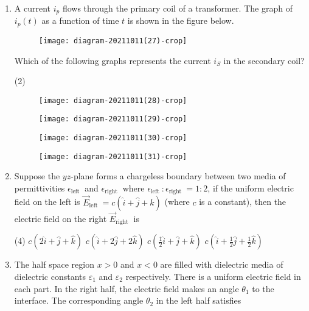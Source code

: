 \begin{enumerate}
	\item A current $i_{p}$ flows through the primary coil of a transformer. The graph of $i_{p}(t)$ as a function of time $t$ is shown in the figure below.\\
	\begin{figure}[H]
		\centering
		\texttt{[image: diagram-20211011(27)-crop]}
	\end{figure}
	Which of the following graphs represents the current $i_{S}$ in the secondary coil?
	{}
	\begin{tasks}(2)
		\task[\textbf{A.}] \begin{figure}[H]
			\centering
			\texttt{[image: diagram-20211011(28)-crop]}
		\end{figure}
		\task[\textbf{B.}] \begin{figure}[H]
			\centering
			\texttt{[image: diagram-20211011(29)-crop]}
		\end{figure}
		\task[\textbf{C.}] \begin{figure}[H]
			\centering
			\texttt{[image: diagram-20211011(30)-crop]}
		\end{figure}
		\task[\textbf{D.}] \begin{figure}[H]
			\centering
			\texttt{[image: diagram-20211011(31)-crop]}
		\end{figure}
	\end{tasks}
	\item Suppose the $y z$-plane forms a chargeless boundary between two media of permittivities $\epsilon_{\text {left }}$ and $\epsilon_{\text {right }}$ where $\epsilon_{\text {left }}: \epsilon_{\text {right }}=1: 2$, if the uniform electric field on the left is $\vec{E}_{\text {left }}=c(\hat{i}+\hat{j}+\hat{k})$ (where $c$ is a constant), then the electric field on the right $\vec{E}_{\text {right }}$ is
	{}
	\begin{tasks}(4)
		\task[\textbf{A.}]  $c(2 \hat{i}+\hat{j}+\hat{k})$
		\task[\textbf{B.}] $c(\hat{i}+2 \hat{j}+2 \hat{k})$
		\task[\textbf{C.}] $c\left(\frac{1}{2} \hat{i}+\hat{j}+\hat{k}\right)$
		\task[\textbf{D.}] $c\left(\hat{i}+\frac{1}{2} \hat{j}+\frac{1}{2} \hat{k}\right)$
	\end{tasks}
	\item  The half space region $x>0$ and $x<0$ are filled with dielectric media of dielectric constants $\varepsilon_{1}$ and $\varepsilon_{2}$ respectively. There is a uniform electric field in each part. In the right half, the electric field makes an angle $\theta_{1}$ to the interface. The corresponding angle $\theta_{2}$ in the left half satisfies

\end{enumerate}
